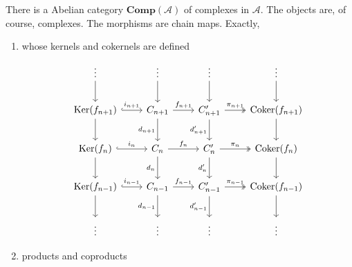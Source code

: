 \documentclass[12pt, oneside]{book}
\begin{document}
\begin{definition}
\begin{enumerate}
    \end{enumerate}
    \begin{remark}
        There is a Abelian category $\mathbf{Comp}(\mathcal{A})$ of complexes in $\mathcal{A}$.
        The objects are, of course, complexes. The morphisms are chain maps. Exactly,
        \begin{enumerate}
            \item
                  whose kernels and cokernels are defined
                  \begin{equation*}
                      \begin{tikzcd}[row sep=2.2em, column sep=2.2em]
                          \vdots \ar[d] & \vdots \ar[d] & \vdots \ar[d] & \vdots \ar[d] \\
                          \Ker(f_{n+1}) \ar[r, hook, "i_{n+1}"] \ar[d] &
                          C_{n+1} \ar[r, "f_{n+1}"] \ar[d, "d_{n+1}"'] &
                          C_{n+1}' \ar[r, two heads, "\pi_{n+1}"] \ar[d, "d_{n+1}'"'] &
                          \Coker(f_{n+1}) \ar[d] \\
                          \Ker(f_{n}) \ar[r, hook, "i_{n}"] \ar[d] &
                          C_{n} \ar[r, "f_{n}"] \ar[d, "d_{n}"'] &
                          C_{n}' \ar[r, two heads, "\pi_{n}"] \ar[d, "d_{n}'"'] &
                          \Coker(f_{n}) \ar[d] \\
                          \Ker(f_{n-1}) \ar[r, hook, "i_{n-1}"] \ar[d] &
                          C_{n-1} \ar[r, "f_{n-1}"] \ar[d, "d_{n-1}"'] &
                          C_{n-1}' \ar[r, two heads, "\pi_{n-1}"] \ar[d, "d_{n-1}'"'] &
                          \Coker(f_{n-1}) \ar[d] \\
                          \vdots & \vdots & \vdots & \vdots
                      \end{tikzcd}
                  \end{equation*}
            \item
                  products and coproducts
        \end{enumerate}
    \end{remark}
\end{definition}
\end{document}
